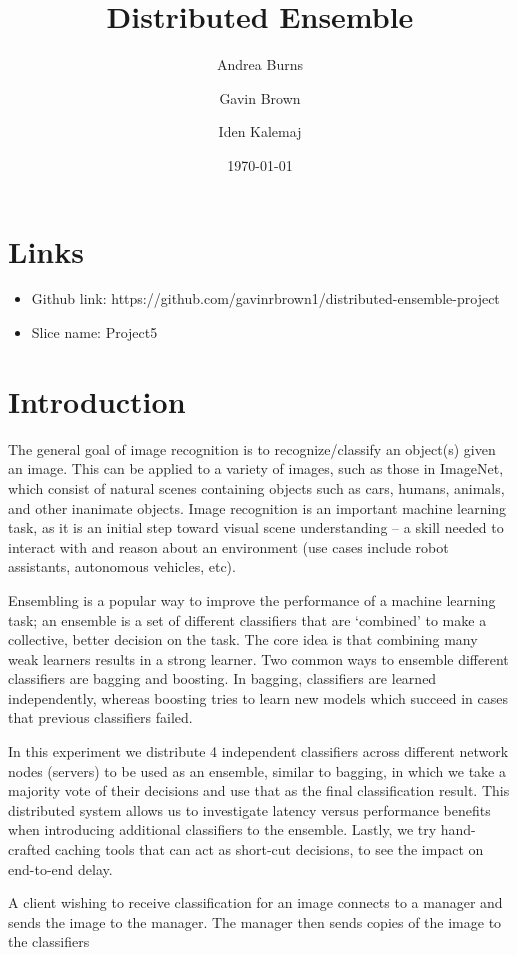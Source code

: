 \documentclass[12pt]{article}
\title{Distributed Ensemble}
\author{Andrea Burns \and Gavin Brown \and Iden Kalemaj}
\date{\today}
\begin{document}
\maketitle
\section{Links}
\begin{itemize}
	\item Github link: https://github.com/gavinrbrown1/distributed-ensemble-project
	\item Slice name: Project5
\end{itemize}


\section{Introduction}

The general goal of image recognition is to recognize/classify an object(s) given an image. This can be applied to a variety of images, such as those in ImageNet, which consist of natural scenes containing objects such as cars, humans, animals, and other inanimate objects. Image recognition is an important machine learning task, as it is an initial step toward visual scene understanding -- a skill needed to interact with and reason about an environment (use cases include robot assistants, autonomous vehicles, etc).

Ensembling is a popular way to improve the performance of a machine learning task; an ensemble is a set of different classifiers that are ‘combined’ to make a collective, better decision on the task. The core idea is that combining many weak learners results in a strong learner. Two common ways to ensemble different classifiers are bagging and boosting. In bagging, classifiers are learned independently, whereas boosting tries to learn new models which succeed in cases that previous classifiers failed. 

In this experiment we distribute 4 independent classifiers across different network nodes (servers) to be used as an ensemble, similar to bagging, in which we take a majority vote of their decisions and use that as the final classification result. This distributed system allows us to investigate latency versus performance benefits when introducing additional classifiers to the ensemble. Lastly, we try hand-crafted caching tools that can act as short-cut decisions, to see the impact on end-to-end delay.


A client wishing to receive classification for an image connects to a manager and sends the image to the manager. The manager then sends copies of the image to the classifiers 
\end{document}

